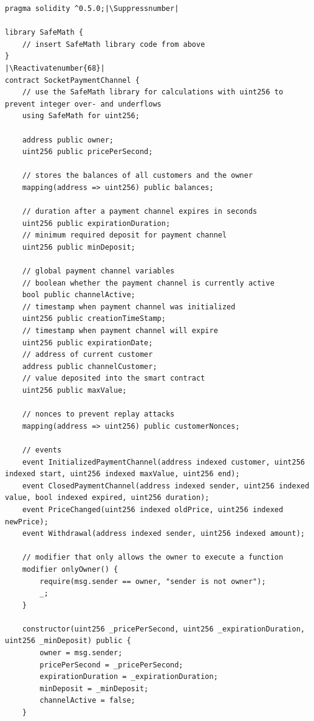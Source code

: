 \begin{lstlisting}[language=Solidity, caption={Payment channel smart contract}, label={lis:pc_sc}]
pragma solidity ^0.5.0;|\Suppressnumber|

library SafeMath {
    // insert SafeMath library code from above
}
|\Reactivatenumber{68}|
contract SocketPaymentChannel {
    // use the SafeMath library for calculations with uint256 to prevent integer over- and underflows
    using SafeMath for uint256;

    address public owner;
    uint256 public pricePerSecond;

    // stores the balances of all customers and the owner
    mapping(address => uint256) public balances;

    // duration after a payment channel expires in seconds
    uint256 public expirationDuration;
    // minimum required deposit for payment channel
    uint256 public minDeposit;

    // global payment channel variables
    // boolean whether the payment channel is currently active
    bool public channelActive;
    // timestamp when payment channel was initialized
    uint256 public creationTimeStamp;
    // timestamp when payment channel will expire
    uint256 public expirationDate;
    // address of current customer
    address public channelCustomer;
    // value deposited into the smart contract
    uint256 public maxValue;

    // nonces to prevent replay attacks
    mapping(address => uint256) public customerNonces;

    // events
    event InitializedPaymentChannel(address indexed customer, uint256 indexed start, uint256 indexed maxValue, uint256 end);
    event ClosedPaymentChannel(address indexed sender, uint256 indexed value, bool indexed expired, uint256 duration);
    event PriceChanged(uint256 indexed oldPrice, uint256 indexed newPrice);
    event Withdrawal(address indexed sender, uint256 indexed amount);

    // modifier that only allows the owner to execute a function
    modifier onlyOwner() {
        require(msg.sender == owner, "sender is not owner");
        _;
    }

    constructor(uint256 _pricePerSecond, uint256 _expirationDuration, uint256 _minDeposit) public {
        owner = msg.sender;
        pricePerSecond = _pricePerSecond;
        expirationDuration = _expirationDuration;
        minDeposit = _minDeposit;
        channelActive = false;
    }


\end{lstlisting}
